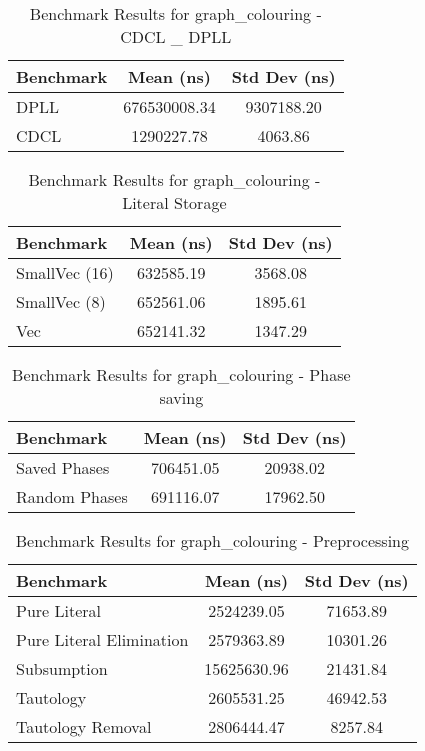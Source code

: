 \begin{table}[h]
    \centering
    \caption{Benchmark Results for graph\_colouring - CDCL \_ DPLL}
    \begin{tabular}{|l|c|c|}
        \hline
        Benchmark & Mean (ns) & Std Dev (ns) \\
        \hline
        DPLL & 676530008.34 & 9307188.20 \\
        CDCL & 1290227.78 & 4063.86 \\
        \hline
    \end{tabular}
\label{tab:bench-graph_colouring---CDCL-_-DPLL}
\end{table}


\begin{table}[h]
    \centering
    \caption{Benchmark Results for graph\_colouring - Literal Storage}
    \begin{tabular}{|l|c|c|}
        \hline
        Benchmark & Mean (ns) & Std Dev (ns) \\
        \hline
        SmallVec (16) & 632585.19 & 3568.08 \\
        SmallVec (8) & 652561.06 & 1895.61 \\
        Vec & 652141.32 & 1347.29 \\
        \hline
    \end{tabular}
\label{tab:bench-graph_colouring---Literal-Storage}
\end{table}


\begin{table}[h]
    \centering
    \caption{Benchmark Results for graph\_colouring - Phase saving}
    \begin{tabular}{|l|c|c|}
        \hline
        Benchmark & Mean (ns) & Std Dev (ns) \\
        \hline
        Saved Phases & 706451.05 & 20938.02 \\
        Random Phases & 691116.07 & 17962.50 \\
        \hline
    \end{tabular}
\label{tab:bench-graph_colouring---Phase-saving}
\end{table}


\begin{table}[h]
    \centering
    \caption{Benchmark Results for graph\_colouring - Preprocessing}
    \begin{tabular}{|l|c|c|}
        \hline
        Benchmark & Mean (ns) & Std Dev (ns) \\
        \hline
        Pure Literal & 2524239.05 & 71653.89 \\
        Pure Literal Elimination & 2579363.89 & 10301.26 \\
        Subsumption & 15625630.96 & 21431.84 \\
        Tautology & 2605531.25 & 46942.53 \\
        Tautology Removal & 2806444.47 & 8257.84 \\
        \hline
    \end{tabular}
\label{tab:bench-graph_colouring---Preprocessing}
\end{table}



